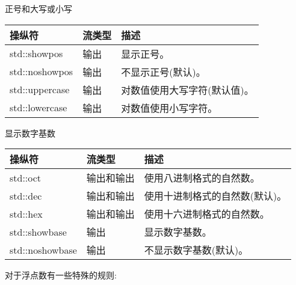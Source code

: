 \begin{center}
正号和大写或小写
\end{center}

\begin{longtable}[c]{|l|l|l|}
\hline
\textbf{操纵符} & \textbf{流类型} & \textbf{描述}                                    \\ \hline
\endfirsthead
%
\endhead
%
std::showpos         & 输出               & 显示正号。                                \\ \hline
std::noshowpos       & 输出               & 不显示正号(默认)。                \\ \hline
std::uppercase       & 输出               & 对数值使用大写字符(默认值)。 \\ \hline
std::lowercase       & 输出               & 对数值使用小写字符。          \\ \hline
\end{longtable}


\begin{center}
显示数字基数
\end{center}

\begin{longtable}[c]{|l|l|l|}
\hline
\textbf{操纵符} & \textbf{流类型} & \textbf{描述}                             \\ \hline
\endfirsthead
%
\endhead
%
std::oct             & 输出和输出     & 使用八进制格式的自然数。            \\ \hline
std::dec             & 输出和输出     & 使用十进制格式的自然数(默认)。 \\ \hline
std::hex             & 输出和输出     & 使用十六进制格式的自然数。      \\ \hline
std::showbase        & 输出               & 显示数字基数。                       \\ \hline
std::noshowbase      & 输出               & 不显示数字基数(默认)。       \\ \hline
\end{longtable}

对于浮点数有一些特殊的规则:

